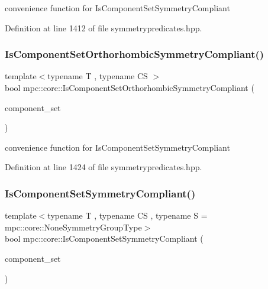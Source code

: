 convenience function for Is\+Component\+Set\+Symmetry\+Compliant 



Definition at line 1412 of file symmetrypredicates.\+hpp.

\mbox{\label{namespacempc_1_1core_a636ef48d9715e8bbe399606d11229114}} 
\subsubsection{\texorpdfstring{Is\+Component\+Set\+Orthorhombic\+Symmetry\+Compliant()}{IsComponentSetOrthorhombicSymmetryCompliant()}}
{\footnotesize\ttfamily template$<$typename T , typename CS $>$ \\
bool mpc\+::core\+::\+Is\+Component\+Set\+Orthorhombic\+Symmetry\+Compliant (\begin{DoxyParamCaption}\item[{const std\+::set$<$ \mbox{\hyperlink{namespacempc_1_1core_ac3a232afc7c680d580628e834030482f}{mpc\+::core\+::\+Tensor\+Rank4\+Component}}$<$ T $>$ $>$ \&}]{component\+\_\+set }\end{DoxyParamCaption})}



convenience function for Is\+Component\+Set\+Symmetry\+Compliant 



Definition at line 1424 of file symmetrypredicates.\+hpp.

\mbox{\label{namespacempc_1_1core_aef4b990e7b443957c2c6bfe0498753d7}} 
\subsubsection{\texorpdfstring{Is\+Component\+Set\+Symmetry\+Compliant()}{IsComponentSetSymmetryCompliant()}}
{\footnotesize\ttfamily template$<$typename T , typename CS , typename S  = mpc\+::core\+::\+None\+Symmetry\+Group\+Type$>$ \\
bool mpc\+::core\+::\+Is\+Component\+Set\+Symmetry\+Compliant (\begin{DoxyParamCaption}\item[{const std\+::set$<$ \mbox{\hyperlink{namespacempc_1_1core_ac3a232afc7c680d580628e834030482f}{mpc\+::core\+::\+Tensor\+Rank4\+Component}}$<$ T $>$ $>$ \&}]{component\+\_\+set }\end{DoxyParamCaption})}



